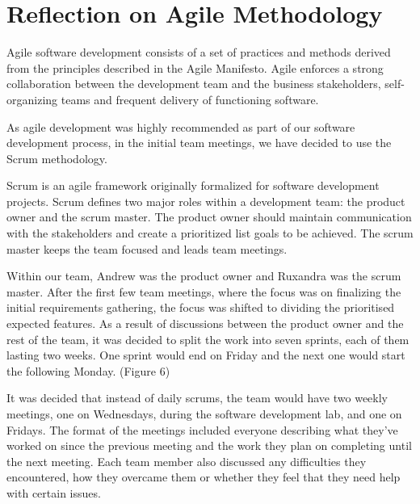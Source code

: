 \documentclass{l3proj}
\begin{document}


\newpage
\section{Reflection on Agile Methodology}
\label{sec:agile}


Agile software development consists of a set of practices and methods derived from the principles described in the Agile Manifesto. Agile enforces a strong collaboration between the development team and the business stakeholders, self-organizing teams and frequent delivery of functioning software.\cite{agile_overview}

As agile development was highly recommended as part of our software development process, in the initial team meetings, we have decided to use the Scrum methodology.
 
 Scrum is an agile framework originally formalized for software development projects. Scrum defines two major roles within a development team: the product owner and the scrum master. The product owner should maintain communication with the stakeholders and create a prioritized list goals to be achieved. The scrum master keeps the team focused and leads team meetings.\cite{scrum_overview}
 
 Within our team, Andrew was the product owner and Ruxandra was the scrum master. After the first few team meetings, where the focus was on finalizing the initial requirements gathering, the focus was shifted to dividing the prioritised expected features. As a result of discussions between the product owner and the rest of the team, it was decided to split the work into seven sprints, each of them lasting two weeks. One sprint would end on Friday and the next one would start the following Monday. (Figure 6)
 
 
 It was decided that instead of daily scrums, the team would have two weekly meetings, one on Wednesdays, during the software development lab, and one on Fridays. The format of the meetings included everyone describing what they've worked on since the previous meeting and the work they plan on completing until the next meeting. Each team member also discussed any difficulties they encountered, how they overcame them or whether they feel that they need help with certain issues.
 
\end{document}
